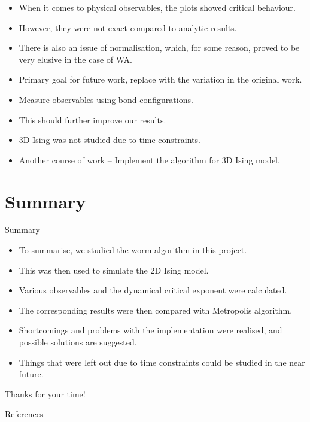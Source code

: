 \documentclass{beamer}
\begin{document}
\begin{frame}
\begin{itemize}
    \item When it comes to physical observables, the plots showed critical behaviour.
    \item However, they were not exact compared to analytic results.
    \item There is also an issue of normalisation, which, for some reason, proved to be very elusive in the case of WA.
    \item Primary goal for future work, replace with the variation in the original work.
    \item Measure observables using bond configurations.
    \item This should further improve our results.
    \item 3D Ising was not studied due to time constraints.
    \item Another course of work – Implement the algorithm for 3D Ising model.
\end{itemize}
\end{frame}

\section{Summary}
\begin{frame}{Summary}
\begin{itemize}
    \item To summarise, we studied the worm algorithm in this project.
    \item This was then used to simulate the 2D Ising model.
    \item Various observables and the dynamical critical exponent were calculated.
    \item The corresponding results were then compared with Metropolis algorithm.
    \item Shortcomings and problems with the implementation were realised, and possible solutions are suggested.
    \item Things that were left out due to time constraints could be studied in the near future.
\end{itemize}
\end{frame}

\begin{frame}
\centering
Thanks for your time!
\end{frame}

\begin{frame}[allowframebreaks]{References}
    \printbibliography
\end{frame}
\end{document}
